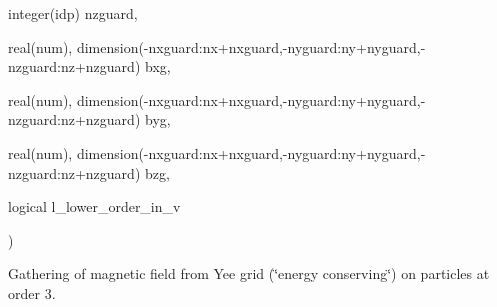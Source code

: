 {\begin{DoxyParamCaption}
\item[{integer(idp)}]{nzguard, }
\item[{real(num), dimension(-\/nxguard\+:nx+nxguard,-\/nyguard\+:ny+nyguard,-\/nzguard\+:nz+nzguard)}]{bxg, }
\item[{real(num), dimension(-\/nxguard\+:nx+nxguard,-\/nyguard\+:ny+nyguard,-\/nzguard\+:nz+nzguard)}]{byg, }
\item[{real(num), dimension(-\/nxguard\+:nx+nxguard,-\/nyguard\+:ny+nyguard,-\/nzguard\+:nz+nzguard)}]{bzg, }
\item[{logical}]{l\+\_\+lower\+\_\+order\+\_\+in\+\_\+v}
\end{DoxyParamCaption}
)}\hypertarget{field__gathering__3d__o3_8_f90_a14f7dada83129910dde71b2237a3113b}{}\label{field__gathering__3d__o3_8_f90_a14f7dada83129910dde71b2237a3113b}


Gathering of magnetic field from Yee grid (\char`\"{}energy conserving\char`\"{}) on particles at order 3. 

